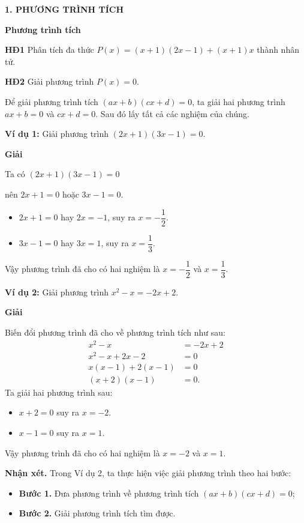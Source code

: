 \begin{lesson}
    \textbf{1. PHƯƠNG TRÌNH TÍCH}

    \textbf{Phương trình tích}

    \textbf{HĐ1} Phân tích đa thức $P(x)=(x+1)(2x-1)+(x+1)x$ thành nhân tử.

    \answerline
    \answerline

    \textbf{HĐ2} Giải phương trình $P(x)=0$.

    \answerline
    \answerline

    \begin{keyconcept}
        Để giải phương trình tích $(ax+b)(cx+d)=0$, ta giải hai phương trình $ax+b=0$ và $cx+d=0$. Sau đó lấy tất cả các nghiệm của chúng.
    \end{keyconcept}

    \textbf{Ví dụ 1:} Giải phương trình $(2x+1)(3x-1)=0$.

    \textbf{Giải}

    Ta có $(2x+1)(3x-1)=0$

    nên $2x+1=0$ hoặc $3x-1=0$.
    \begin{itemize}
        \item $2x+1=0$ hay $2x=-1$, suy ra $x=-\dfrac{1}{2}$.
        \item $3x-1=0$ hay $3x=1$, suy ra $x=\dfrac{1}{3}$.
    \end{itemize}
    Vậy phương trình đã cho có hai nghiệm là $x=-\dfrac{1}{2}$ và $x=\dfrac{1}{3}$.

    \textbf{Ví dụ 2:} Giải phương trình $x^2-x=-2x+2$.

    \textbf{Giải}

    Biến đổi phương trình đã cho về phương trình tích như sau:
    \[
        \begin{aligned}
            x^2-x&=-2x+2\\
            x^2-x+2x-2&=0\\
            x(x-1)+2(x-1)&=0\\
            (x+2)(x-1)&=0.
        \end{aligned}
    \]
    Ta giải hai phương trình sau:
    \begin{itemize}
        \item $x+2=0$ suy ra $x=-2$.
        \item $x-1=0$ suy ra $x=1$.
    \end{itemize}
    Vậy phương trình đã cho có hai nghiệm là $x=-2$ và $x=1$.

    \textbf{Nhận xét.} Trong Ví dụ 2, ta thực hiện việc giải phương trình theo hai bước:
    \begin{itemize}
        \item \textbf{Bước 1.} Đưa phương trình về phương trình tích $(ax+b)(cx+d)=0$;
        \item \textbf{Bước 2.} Giải phương trình tích tìm được.
    \end{itemize}


\end{lesson}
